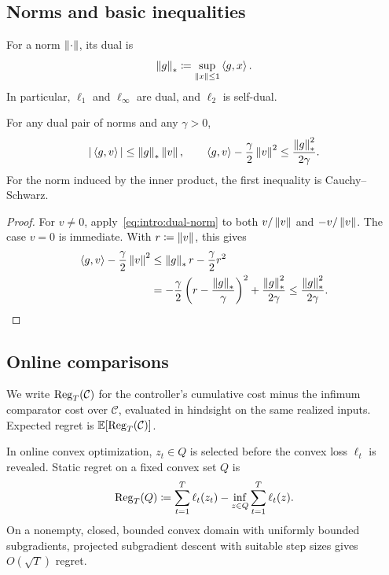 \subsection{Norms and basic inequalities}

For a norm $\left\lVert \cdot \right\rVert$, its dual is
\begin{equation}\label{eq:intro:dual-norm}
 \left\lVert g \right\rVert_*\coloneqq\sup_{\left\lVert x \right\rVert\le1}\left\langle g,x \right\rangle.
\end{equation}
In particular, $\ell_1$ and $\ell_\infty$ are dual, and $\ell_2$ is self-dual.

\begin{Thm:Lemma}\label{lem:holder}
For any dual pair of norms and any $\gamma>0$,
\begin{equation}\label{eq:intro:holder-young}
 |\left\langle g,v \right\rangle|\le\left\lVert g \right\rVert_*\left\lVert v \right\rVert,\qquad
 \left\langle g,v \right\rangle-\frac\gamma2\left\lVert v \right\rVert^2
 \le\frac{\left\lVert g \right\rVert_*^2}{2\gamma}.
\end{equation}
For the norm induced by the inner product, the first inequality is Cauchy--Schwarz.
\end{Thm:Lemma}
\begin{proof}
For $v\ne0$, apply~\eqref{eq:intro:dual-norm} to both
$v/\left\lVert v \right\rVert$ and $-v/\left\lVert v \right\rVert$. The case $v=0$ is immediate.
With $r\coloneqq\left\lVert v \right\rVert$, this gives
\begin{align*}
 \left\langle g,v \right\rangle-\frac\gamma2\left\lVert v \right\rVert^2
 &\le \left\lVert g \right\rVert_*r-\frac\gamma2r^2\\
 &=-\frac\gamma2\left(r-\frac{\left\lVert g \right\rVert_*}{\gamma}\right)^2
   +\frac{\left\lVert g \right\rVert_*^2}{2\gamma}
 \le \frac{\left\lVert g \right\rVert_*^2}{2\gamma}.\qedhere
\end{align*}
\end{proof}

\subsection{Online comparisons}

We write $\mathrm{Reg}_T(\mathcal C)$ for the controller's cumulative cost minus
the infimum comparator cost over $\mathcal C$, evaluated in hindsight on
the same realized inputs. Expected regret is $\mathbb{E}[\mathrm{Reg}_T(\mathcal C)]$.

In online convex optimization, $z_t\in Q$ is selected before the convex
loss $\ell_t$ is revealed. Static regret on a fixed convex set $Q$
\cite{zinkevich2003online,hazan2016introduction} is
\begin{equation}\label{eq:intro:static-regret}
 \mathrm{Reg}_T(Q)\coloneqq\sum_{t=1}^T\ell_t(z_t)-\inf_{z\in Q}\sum_{t=1}^T\ell_t(z).
\end{equation}
On a nonempty, closed, bounded convex domain with uniformly bounded
subgradients, projected subgradient descent with suitable step sizes gives
$O(\sqrt T)$ regret.

